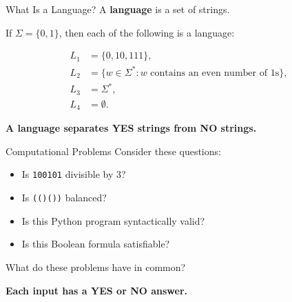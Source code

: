 \documentclass[10pt,aspectratio=169]{beamer}
\newcommand{\term}[1]{\textcolor{tocblue}{\textbf{#1}}}
\newcommand{\keyidea}[1]{\begin{center}\alert{\textbf{#1}}\end{center}}
\begin{document}
\begin{frame}{What Is a Language?}
A \term{language} is a set of strings.

\vspace{1.2em}

\pause
If $\Sigma = \{0,1\}$, then each of the following is a language:

\begin{align*}
L_1 &= \{0, 10, 111\}, \\
L_2 &= \{w \in \Sigma^* : w \text{ contains an even number of } 1\text{s}\}, \\
L_3 &= \Sigma^*, \\
L_4 &= \emptyset.
\end{align*}

\pause
\keyidea{A language separates YES strings from NO strings.}
\end{frame}

\begin{frame}{Computational Problems}
Consider these questions:

\vspace{0.5em}

\begin{itemize}
\item Is \texttt{100101} divisible by 3?
\item Is \texttt{(()())} balanced?
\item Is this Python program syntactically valid?
\item Is this Boolean formula satisfiable?
\end{itemize}

\pause
\vspace{1em}

\begin{center}
What do these problems have in common?
\end{center}

\pause
\keyidea{Each input has a YES or NO answer.}
\end{frame}
\end{document}

